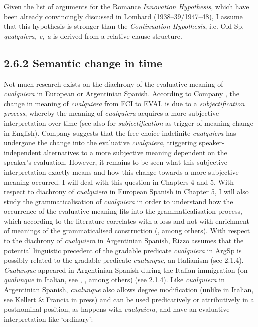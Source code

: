   Given the list of arguments for the Romance \textit{Innovation Hypothesis}, which have been already convincingly discussed in Lombard (1938–39/1947–48), I assume that this hypothesis is stronger than the \textit{Continuation Hypothesis}, i.e. Old Sp.\textbf{ }\textit{qualquiera,-e,-a} is derived from a relative clause structure.

\subsection{\textbf{2.6.2} \textbf{Semantic} \textbf{change} \textbf{in} \textbf{time}}

Not much research exists on the diachrony of the evaluative meaning of \textit{cualquiera} in European or Argentinian Spanish. According to Company \citet{Company2009}, the change in meaning of \textit{cualquiera} from FCI to EVAL is due to a \textit{subjectification process}, whereby the meaning of \textit{cualquiera} acquires a more subjective interpretation over time (see also \citealt{Traugott1989} for \textit{subjectification} as trigger of meaning change in English). Company \citet{Company2009} suggests that the free choice indefinite \textit{cualquiera} has undergone the change into the evaluative \textit{cualquiera}, triggering speaker-independent alternatives to a more subjective meaning dependent on the speaker’s evaluation. However, it remains to be seen what this subjective interpretation exactly means and how this change towards a more subjective meaning occurred. I will deal with this question in Chapters 4 and 5. With respect to diachrony of \textit{cualquiera} in European Spanish in Chapter 5, I will also study the grammaticalisation of \textit{cualquiera} in order to understand how the occurrence of the evaluative meaning fits into the grammaticalisation process, which according to the literature correlates with a loss and not with enrichment of meanings of the grammaticalised construction (\citealt{Traugott1989}, among others). With respect to the diachrony of \textit{cualquiera} in Argentinian Spanish, Rizzo \citet{Salierno2013} assumes that the potential linguistic precedent of the gradable predicate \textit{cualquiera} in ArgSp is possibly related to the gradable predicate \textit{cualunque}, an Italianism (see 2.1.4). \textit{Cualunque} appeared in Argentinian Spanish during the Italian immigration (on \textit{qualunque} in Italian, see \citealt{Chierchia2006}, \citealt{AloniEtAl2010}, among others) (see 2.1.4). Like \textit{cualquiera} in Argentinian Spanish, \textit{cualunque} also allows degree modification (unlike in Italian, see Kellert \& Francia in press) and can be used predicatively or attributively in a postnominal position, as happens with \textit{cualquiera}, and have an evaluative interpretation like ‘ordinary’:

